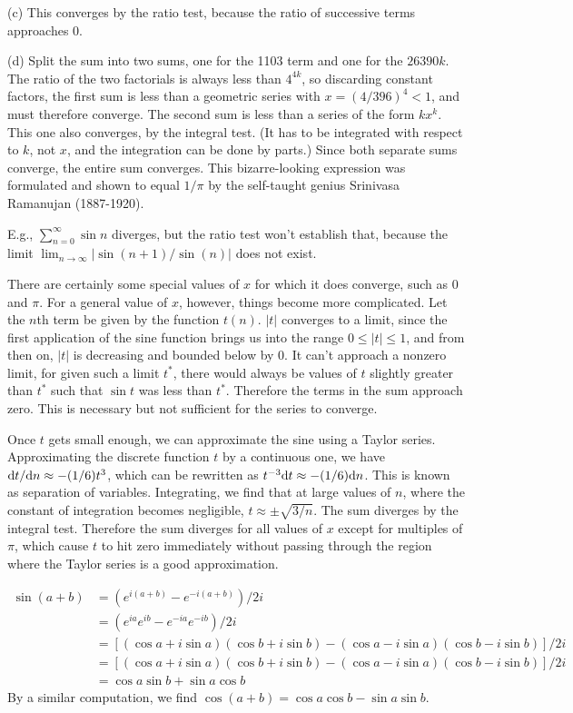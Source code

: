 (c) This converges by the ratio test, because the ratio of successive terms approaches 0.

(d) Split the sum into two sums, one for the 1103 term and one for the $26390k$. The ratio of the two factorials is always less than $4^{4k}$, so
discarding constant factors, the first sum is less than a geometric series with $x=(4/396)^4<1$, and must therefore converge. The second sum is less than a series of the form $kx^k$.
This one also converges, by the integral test. (It has to be integrated with respect to $k$, not $x$, and the integration can be done by parts.) Since both separate sums converge,
the entire sum converges. This bizarre-looking expression was formulated and shown to equal $1/\pi$ by the self-taught genius Srinivasa Ramanujan (1887-1920).

E.g., $\sum_{n=0}^\infty \sin n$ diverges, but the ratio test won't establish that, because
the limit $\lim_{n\rightarrow\infty}|\sin(n+1)/\sin(n)|$ does not exist.

There are certainly some special values of $x$ for which it does converge, such as 0 and $\pi$.
For a general value of $x$, however, things become more complicated. Let the $n$th term be given by the function $t(n)$.
$|t|$ converges to a limit, since the first application of the sine function brings us into the range $0\le |t|\le 1$,
and from then on, $|t|$ is decreasing and bounded below by 0. It can't approach a nonzero limit, for given such a limit $t^*$,
there would always be values of $t$ slightly greater than $t^*$ such that $\sin t$ was less than $t^*$. Therefore the terms
in the sum approach zero. This is necessary but not sufficient for the series to converge.

Once $t$ gets small enough, we can approximate the sine
using a Taylor series. Approximating the discrete function $t$ by a continuous one,
we have $\textup{d} t/\textup{d} n\approx -(1/6)t^3$, which can be rewritten as $t^{-3}\textup{d} t\approx -(1/6)\textup{d} n$. This is known as
separation of variables. Integrating, we find that at large values of $n$, where the constant of integration becomes negligible,
$t\approx \pm\sqrt{3/n}$. The sum diverges by the integral test. Therefore the sum diverges for all values of $x$ except for
multiples of $\pi$, which cause $t$ to hit zero immediately without passing through the region where the Taylor series
is a good approximation.

\begin{align*}
\sin(a+b) &= \left(e^{i(a+b)}-e^{-i(a+b)}\right)/2i \\
          &= \left(e^{ia}e^{ib}-e^{-ia}e^{-ib}\right)/2i \\
          &= \left[(\cos a+i\sin a)(\cos b+i\sin b)-(\cos a-i\sin a)(\cos b-i\sin b)\right]/2i \\
          &= \left[(\cos a+i\sin a)(\cos b+i\sin b)-(\cos a-i\sin a)(\cos b-i\sin b)\right]/2i \\
          &= \cos a\sin b +\sin a\cos b 
\end{align*}
By a similar computation, we find $\cos(a+b)=\cos a\cos b-\sin a\sin b$.

